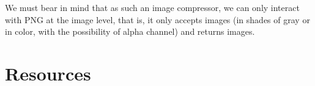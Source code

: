 We must bear in mind that as such an image compressor, we can only
interact with PNG at the image level, that is, it only accepts images
(in shades of gray or in color, with the possibility of alpha channel)
and returns images.


\section{Resources}

\renewcommand{\addcontentsline}[3]{}%

